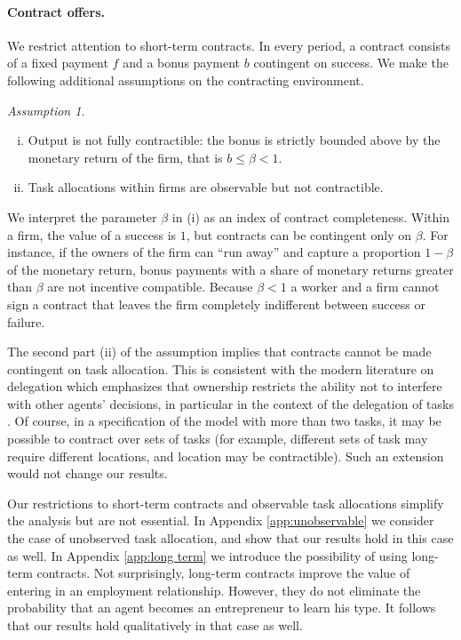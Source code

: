 \documentclass[12pt,american]{paper}
\theoremstyle{remark}
\newtheorem{ass}{Assumption}
\begin{document}
\paragraph{Contract offers.} 
We restrict attention to short-term contracts. In every period, a contract consists of a fixed payment $f$ and a bonus payment $b$ contingent on success. We make the following additional assumptions on the contracting environment.

\begin{ass}
\hspace{1cm}
\begin{enumerate}[(i)]
\item Output is not fully contractible: the bonus is strictly bounded above by the monetary return of the firm, that is $b\leq \beta < 1$.
\item Task allocations within firms are observable but not contractible.
\end{enumerate} 
\end{ass}
%
We interpret the parameter $\beta$ in (i) as an index of contract completeness. Within a firm, the value of a success is $1$, but contracts can be contingent only on $\beta$. For instance, if the owners of the firm can ``run away''  and capture a proportion $1-\beta$ of the monetary return, bonus payments with a share of monetary returns greater than $\beta$ are not incentive compatible.  Because $\beta < 1$ a worker and a firm cannot sign a contract that leaves the firm completely indifferent between success or failure.

The second part (ii) of the assumption implies that contracts cannot be made contingent on task allocation. This is consistent with the modern literature on delegation which emphasizes that  ownership  restricts the ability not to interfere with other agents' decisions, in particular in the context of the delegation of tasks \citep{aghion1997a,Baker:1999fv}. %
Of course, in a specification of the model with more than two tasks, it may be possible to contract over sets of tasks (for example, different sets of task may require different locations, and location may be contractible). Such an extension would not change our results.%

Our restrictions to short-term contracts and observable task allocations simplify the analysis but are not essential. In Appendix \ref{app:unobservable}  we consider the case of unobserved task allocation, and show that our results hold in this case as well. In Appendix \ref{app:long term} we introduce the possibility of using long-term contracts. Not surprisingly, long-term contracts improve the value of entering in an employment relationship. However, they do not eliminate the probability that an agent becomes an entrepreneur to learn his type. It follows that our results hold qualitatively in that case as well.
\end{document}
